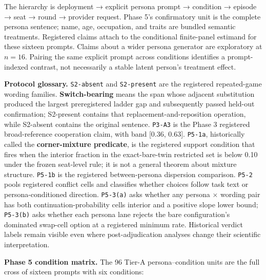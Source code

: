 \documentclass[
  11pt]{article}
\begin{document}
The hierarchy is deployment → explicit persona prompt → condition →
episode → seat → round → provider request. Phase 5's confirmatory unit
is the complete persona sentence; name, age, occupation, and traits are
bundled semantic treatments. Registered claims attach to the conditional
finite-panel estimand for these sixteen prompts. Claims about a wider
persona generator are exploratory at \(n=16\). Pairing the same explicit
prompt across conditions identifies a prompt-indexed contrast, not
necessarily a stable latent person's treatment effect.

\textbf{Protocol glossary.} \texttt{S2-absent} and \texttt{S2-present}
are the registered repeated-game wording families.
\textbf{Switch-bearing} means the span whose adjacent substitution
produced the largest preregistered ladder gap and subsequently passed
held-out confirmation; S2-present contains that
replacement-and-reposition operation, while S2-absent contains the
original sentence. \texttt{P3-A3} is the Phase 3 registered
broad-reference cooperation claim, with band {[}0.36, 0.63{]}.
\texttt{P5-1a}, historically called the \textbf{corner-mixture
predicate}, is the registered support condition that fires when the
interior fraction in the exact-bare-twin restricted set is below 0.10
under the frozen seat-level rule; it is not a general theorem about
mixture structure. \texttt{P5-1b} is the registered between-persona
dispersion comparison. \texttt{P5-2} pools registered conflict cells and
classifies whether choices follow task text or persona-conditioned
direction. \texttt{P5-3(a)} asks whether any persona × wording pair has
both continuation-probability cells interior and a positive slope lower
bound; \texttt{P5-3(b)} asks whether each persona lane rejects the bare
configuration's dominated swap-cell option at a registered minimum rate.
Historical verdict labels remain visible even where post-adjudication
analyses change their scientific interpretation.

\textbf{Phase 5 condition matrix.} The 96 Tier-A persona--condition
units are the full cross of sixteen prompts with six conditions:
\end{document}
